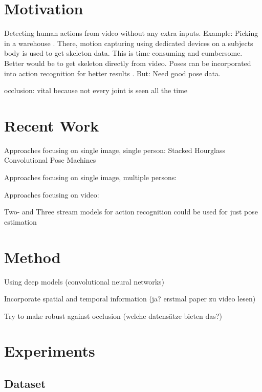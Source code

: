 \documentclass[twoside]{article}
\begin{document}
\begin{multicols}{2} %

\section{Motivation}

Detecting human actions from video without any extra inputs. Example: Picking in a warehouse \cite{reining_towards_2018}. There, motion capturing using dedicated devices on a subjects body is used to get skeleton data. This is time consuming and cumbersome. Better would be to get skeleton directly from video.
Poses can be incorporated into action recognition for better results \cite{khalid_multi-modal_2018}. But: Need good pose data.

occlusion:
    vital because not every joint is seen all the time



\section{Recent Work}
Approaches focusing on single image, single person:
    Stacked Hourglass \cite{newell_stacked_2016}
    Convolutional Pose Machines \cite{wei_convolutional_2016}

Approaches focusing on single image, multiple persons:

Approaches focusing on video:

Two- and Three stream models for action recognition could be used for just pose estimation

\section{Method}

Using deep models (convolutional neural networks)

Incorporate spatial and temporal information (ja? erstmal paper zu video lesen)

Try to make robust against occlusion (welche datensätze bieten das?)


\section{Experiments}
\subsection{Dataset}


\end{multicols}
\end{document}
